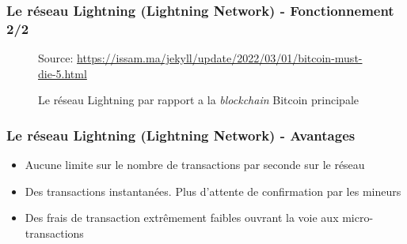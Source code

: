 \begin{frame}
	\frametitle{Le réseau Lightning (Lightning Network) - Fonctionnement 2/2}
	\begin{figure}[h!]
		{\scriptsize Source: \url{https://issam.ma/jekyll/update/2022/03/01/bitcoin-must-die-5.html}}

		\caption{Le réseau Lightning par rapport a la \textit{blockchain} Bitcoin principale}

	\end{figure}

\end{frame}

\begin{frame}
	\frametitle{Le réseau Lightning (Lightning Network) - Avantages}
	\begin{itemize}
		\item Aucune limite sur le nombre de transactions par seconde sur le réseau
		      \newline
		\item Des transactions instantanées. Plus d’attente de confirmation par les mineurs
		      \newline
		\item Des frais de transaction extrêmement faibles ouvrant la voie aux micro-transactions
	\end{itemize}
\end{frame}

